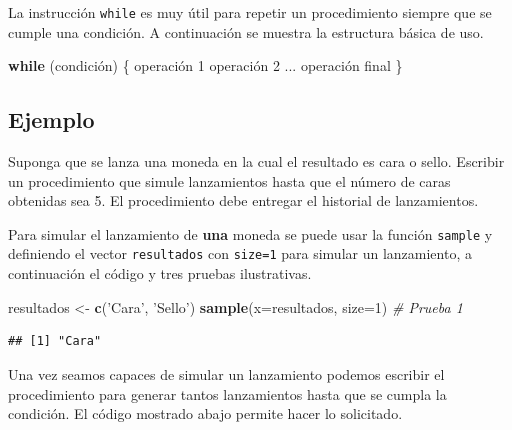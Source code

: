 \documentclass[10pt,]{krantz}
\makeatletter
\newenvironment{Shaded}{\begin{snugshade}}{\end{snugshade}}
\newcommand{\KeywordTok}[1]{\textcolor[rgb]{0.13,0.29,0.53}{\textbf{#1}}}
\newcommand{\DataTypeTok}[1]{\textcolor[rgb]{0.13,0.29,0.53}{#1}}
\newcommand{\DecValTok}[1]{\textcolor[rgb]{0.00,0.00,0.81}{#1}}
\newcommand{\StringTok}[1]{\textcolor[rgb]{0.31,0.60,0.02}{#1}}
\newcommand{\CommentTok}[1]{\textcolor[rgb]{0.56,0.35,0.01}{\textit{#1}}}
\newcommand{\ControlFlowTok}[1]{\textcolor[rgb]{0.13,0.29,0.53}{\textbf{#1}}}
\newcommand{\NormalTok}[1]{#1}
\newenvironment{kframe}{%
\medskip{}
\setlength{\fboxsep}{.8em}
 \def\at@end@of@kframe{}%
 \ifinner\ifhmode%
  \def\at@end@of@kframe{\end{minipage}}%
  \begin{minipage}{\columnwidth}%
 \fi\fi%
 \def\FrameCommand##1{\hskip\@totalleftmargin \hskip-\fboxsep
 \colorbox{shadecolor}{##1}\hskip-\fboxsep
     \hskip-\linewidth \hskip-\@totalleftmargin \hskip\columnwidth}%
 \MakeFramed {\advance\hsize-\width
   \@totalleftmargin\z@ \linewidth\hsize
   \@setminipage}}%
 {\par\unskip\endMakeFramed%
 \at@end@of@kframe}
\renewenvironment{Shaded}{\begin{kframe}}{\end{kframe}}
\makeatother
\begin{document}
La instrucción \texttt{while} es muy útil para repetir un procedimiento
siempre que se cumple una condición. A continuación se muestra la
estructura básica de uso.

\begin{Shaded}
\begin{Highlighting}[]
\ControlFlowTok{while}\NormalTok{ (condición) \{}
\NormalTok{  operación }\DecValTok{1}
\NormalTok{  operación }\DecValTok{2}
\NormalTok{  ...}
\NormalTok{  operación final}
\NormalTok{\}}
\end{Highlighting}
\end{Shaded}

\subsection*{Ejemplo}\label{ejemplo-18}


Suponga que se lanza una moneda en la cual el resultado es cara o sello.
Escribir un procedimiento que simule lanzamientos hasta que el número de
caras obtenidas sea 5. El procedimiento debe entregar el historial de
lanzamientos.

Para simular el lanzamiento de \textbf{una} moneda se puede usar la
función \texttt{sample} y definiendo el vector \texttt{resultados} con
\texttt{size=1} para simular un lanzamiento, a continuación el código y
tres pruebas ilustrativas.

\begin{Shaded}
\begin{Highlighting}[]
\NormalTok{resultados <-}\StringTok{ }\KeywordTok{c}\NormalTok{(}\StringTok{'Cara'}\NormalTok{, }\StringTok{'Sello'}\NormalTok{)}
\KeywordTok{sample}\NormalTok{(}\DataTypeTok{x=}\NormalTok{resultados, }\DataTypeTok{size=}\DecValTok{1}\NormalTok{)  }\CommentTok{# Prueba 1}
\end{Highlighting}
\end{Shaded}

\begin{verbatim}
## [1] "Cara"
\end{verbatim}

Una vez seamos capaces de simular un lanzamiento podemos escribir el
procedimiento para generar tantos lanzamientos hasta que se cumpla la
condición. El código mostrado abajo permite hacer lo solicitado.
\end{document}
